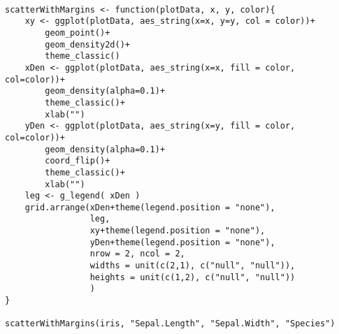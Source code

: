 \documentclass[11pt]{article}
\begin{document}
\begin{verbatim}

scatterWithMargins <- function(plotData, x, y, color){
    xy <- ggplot(plotData, aes_string(x=x, y=y, col = color))+
        geom_point()+
        geom_density2d()+
        theme_classic()
    xDen <- ggplot(plotData, aes_string(x=x, fill = color, col=color))+
        geom_density(alpha=0.1)+
        theme_classic()+
        xlab("")
    yDen <- ggplot(plotData, aes_string(x=y, fill = color, col=color))+
        geom_density(alpha=0.1)+
        coord_flip()+
        theme_classic()+
        xlab("")
    leg <- g_legend( xDen )
    grid.arrange(xDen+theme(legend.position = "none"),
                 leg,
                 xy+theme(legend.position = "none"),
                 yDen+theme(legend.position = "none"),
                 nrow = 2, ncol = 2,
                 widths = unit(c(2,1), c("null", "null")),
                 heights = unit(c(1,2), c("null", "null"))
                 )
}

scatterWithMargins(iris, "Sepal.Length", "Sepal.Width", "Species")
\end{verbatim}
\end{document}
